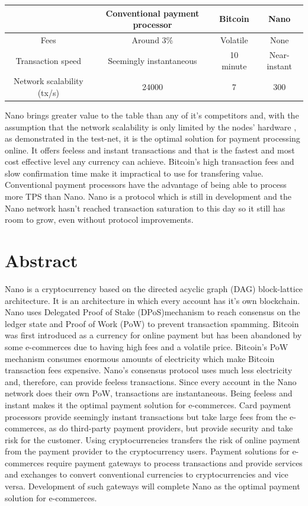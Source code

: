 \documentclass{ferseminar}
\begin{document}
\begin{center}
	\begin{tabular}{ |c||c|c|c| }
		\hline
		& Conventional payment processor & Bitcoin & Nano\\ 
		\hline\hline
		Fees & Around 3\% & Volatile & None\\  
		\hline
		Transaction speed & Seemingly instantaneous & 10 minute & Near-instant\\
		\hline
		Network scalability (tx/s) & 24000 & 7 & 300\\
		\hline
	\end{tabular}
\end{center}

Nano brings greater value to the table than any of it's competitors and, with the assumption that the network scalability is only limited by the nodes' hardware \cite{Nano}, as demonstrated in the test-net, it is the optimal solution for payment processing online. It offers feeless and instant transactions and that is the fastest and most cost effective level any currency can achieve.
Bitcoin's high transaction fees and slow confirmation time make it impractical to use for transfering value. 
Conventional payment processors have the advantage of being able to process more TPS than Nano. Nano is a protocol which is still in development and the Nano network hasn't reached transaction saturation to this day so it still has room to grow, even without protocol improvements. 
\section{Abstract}
Nano is a cryptocurrency based on the directed acyclic graph (DAG) block-lattice architecture. It is an architecture in which every account has it's own blockchain. Nano uses Delegated Proof of Stake (DPoS)mechanism to reach consensus on the ledger state and Proof of Work (PoW) to prevent transaction spamming. Bitcoin was first introduced as a currency for online payment but has been abandoned by some e-commerces due to having high fees and a volatile price. Bitcoin's PoW mechanism consumes enormous amounts of electricity which make Bitcoin transaction fees expensive. Nano's consensus protocol uses much less electricity and, therefore, can provide feeless transactions. Since every account in the Nano network does their own PoW, transactions are instantaneous. Being feeless and instant makes it the optimal payment solution for e-commerces. Card payment processors provide seemingly instant transactions but take large fees from the e-commerces, as do third-party payment providers, but provide security and take risk for the customer. Using cryptocurrencies transfers the risk of online payment from the payment provider to the cryptocurrency users. Payment solutions for e-commerces require payment gateways to process transactions and provide services and exchanges to convert conventional currencies to cryptocurrencies and vice versa. Development of such gateways will complete Nano as the optimal payment solution for e-commerces. 
\end{document}
